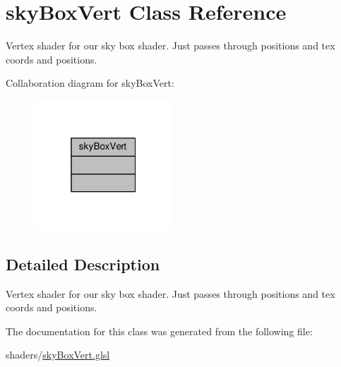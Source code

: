 \hypertarget{classsky_box_vert}{\section{sky\-Box\-Vert Class Reference}
\label{classsky_box_vert}
}


Vertex shader for our sky box shader. Just passes through positions and tex coords and positions.  




Collaboration diagram for sky\-Box\-Vert\-:\nopagebreak
\begin{figure}[H]
\begin{center}
\leavevmode
\includegraphics[width=148pt]{classsky_box_vert__coll__graph}
\end{center}
\end{figure}


\subsection{Detailed Description}
Vertex shader for our sky box shader. Just passes through positions and tex coords and positions. 

The documentation for this class was generated from the following file\-:\begin{DoxyCompactItemize}
\item 
shaders/\hyperlink{sky_box_vert_8glsl}{sky\-Box\-Vert.\-glsl}\end{DoxyCompactItemize}
